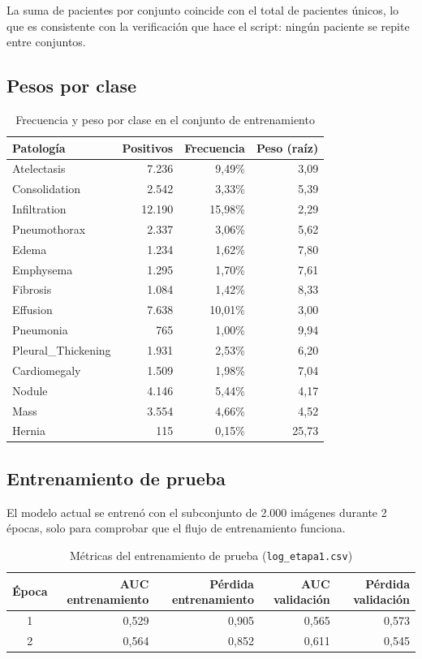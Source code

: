 \documentclass[11.5pt]{article}
\begin{document}
La suma de pacientes por conjunto coincide con el total de pacientes únicos, lo que es consistente con la verificación que hace el script: ningún paciente se repite entre conjuntos.

\subsection{Pesos por clase}

\begin{table}[H]
\centering
\small
\caption{Frecuencia y peso por clase en el conjunto de entrenamiento}
\label{tab:pesos}
\begin{tabular}{l r r r}
\toprule
Patología & Positivos & Frecuencia & Peso (raíz) \\
\midrule
Atelectasis & 7.236 & 9,49\% & 3,09 \\
Consolidation & 2.542 & 3,33\% & 5,39 \\
Infiltration & 12.190 & 15,98\% & 2,29 \\
Pneumothorax & 2.337 & 3,06\% & 5,62 \\
Edema & 1.234 & 1,62\% & 7,80 \\
Emphysema & 1.295 & 1,70\% & 7,61 \\
Fibrosis & 1.084 & 1,42\% & 8,33 \\
Effusion & 7.638 & 10,01\% & 3,00 \\
Pneumonia & 765 & 1,00\% & 9,94 \\
Pleural\_Thickening & 1.931 & 2,53\% & 6,20 \\
Cardiomegaly & 1.509 & 1,98\% & 7,04 \\
Nodule & 4.146 & 5,44\% & 4,17 \\
Mass & 3.554 & 4,66\% & 4,52 \\
Hernia & 115 & 0,15\% & 25,73 \\
\bottomrule
\end{tabular}
\end{table}

\subsection{Entrenamiento de prueba}

El modelo actual se entrenó con el subconjunto de 2.000 imágenes durante 2 épocas, solo para comprobar que el flujo de entrenamiento funciona.

\begin{table}[H]
\centering
\small
\caption{Métricas del entrenamiento de prueba (\texttt{log\_etapa1.csv})}
\label{tab:sanity}
\begin{tabular}{c r r r r}
\toprule
Época & AUC entrenamiento & Pérdida entrenamiento & AUC validación & Pérdida validación \\
\midrule
1 & 0,529 & 0,905 & 0,565 & 0,573 \\
2 & 0,564 & 0,852 & 0,611 & 0,545 \\
\bottomrule
\end{tabular}
\end{table}
\end{document}
